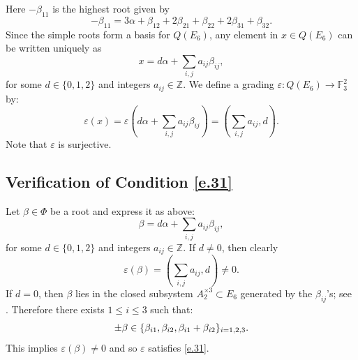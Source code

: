 \documentclass[12pt]{amsart}
\numberwithin{equation}{section}
\theoremstyle{definition}
\newcommand{\bF}{\mathbb{F}}
\newcommand{\bZ}{\mathbb{Z}}
\newcommand{\eps}{\varepsilon}
\begin{document}
\begin{center}
\end{center}
%
Here $-\beta_{11}$ is the highest root given by $$-\beta_{11} = 3\alpha +\beta_{12}+ 2\beta_{21} + \beta_{22}+ 2\beta_{31}+\beta_{32}.$$
Since the simple roots form a basis for $Q(E_6)$, any element in $x\in Q(E_6)$ can be written uniquely as
\begin{equation}\label{e.E6v}
    x = d \alpha + \sum_{i,j} a_{ij}\beta_{ij},
\end{equation}
for some $d\in \{0,1,2\}$ and integers $a_{ij}\in \bZ$. We define a grading $\eps: Q(E_6) \to \bF_3^2$ by:
$$\eps(x) = \eps(d \alpha + \sum_{i,j} a_{ij}\beta_{ij}) = (\sum_{i,j} a_{ij}, d).$$
Note that $\eps$ is surjective. 
%
\subsection*{Verification of Condition \eqref{e.31}}
Let $\beta\in \Phi$ be a root and express it as above:
$$ \beta =  d \alpha + \sum_{i,j} a_{ij}\beta_{ij},$$
for some $d\in \{0,1,2\}$ and integers $a_{ij}\in \bZ$. If $d \neq 0$, then clearly $$\eps(\beta) = (\sum_{i,j}a_{ij},d) \neq 0.$$
If $d =0$, then $\beta$ lies in the closed subsystem $A_2^{\times 3} \subset E_6$ generated by the $\beta_{ij}$'s; see \cite[Section 4]{chernousov2006another}. Therefore there exists $1\leq i\leq 3$ such that: 
$$\pm \beta \in \{ \beta_{i1}, \beta_{i2}, \beta_{i1}+\beta_{i2}\}_{\tiny i = 1,2,3}.$$
This implies $\eps(\beta) \neq 0$ and so $\eps$ satisfies \eqref{e.31}. 
\end{document}
